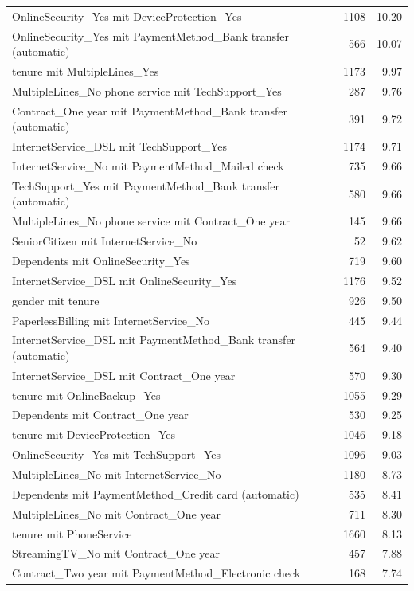 \documentclass[a4paper,11pt]{article}
\begin{document}
\begin{longtable}{p{9cm}rr}
OnlineSecurity\_Yes mit DeviceProtection\_Yes & 1108 & 10.20 \\
OnlineSecurity\_Yes mit PaymentMethod\_Bank transfer (automatic) & 566 & 10.07 \\
tenure mit MultipleLines\_Yes & 1173 & 9.97 \\
MultipleLines\_No phone service mit TechSupport\_Yes & 287 & 9.76 \\
Contract\_One year mit PaymentMethod\_Bank transfer (automatic) & 391 & 9.72 \\
InternetService\_DSL mit TechSupport\_Yes & 1174 & 9.71 \\
InternetService\_No mit PaymentMethod\_Mailed check & 735 & 9.66 \\
TechSupport\_Yes mit PaymentMethod\_Bank transfer (automatic) & 580 & 9.66 \\
MultipleLines\_No phone service mit Contract\_One year & 145 & 9.66 \\
SeniorCitizen mit InternetService\_No & 52 & 9.62 \\
Dependents mit OnlineSecurity\_Yes & 719 & 9.60 \\
InternetService\_DSL mit OnlineSecurity\_Yes & 1176 & 9.52 \\
gender mit tenure & 926 & 9.50 \\
PaperlessBilling mit InternetService\_No & 445 & 9.44 \\
InternetService\_DSL mit PaymentMethod\_Bank transfer (automatic) & 564 & 9.40 \\
InternetService\_DSL mit Contract\_One year & 570 & 9.30 \\
tenure mit OnlineBackup\_Yes & 1055 & 9.29 \\
Dependents mit Contract\_One year & 530 & 9.25 \\
tenure mit DeviceProtection\_Yes & 1046 & 9.18 \\
OnlineSecurity\_Yes mit TechSupport\_Yes & 1096 & 9.03 \\
MultipleLines\_No mit InternetService\_No & 1180 & 8.73 \\
Dependents mit PaymentMethod\_Credit card (automatic) & 535 & 8.41 \\
MultipleLines\_No mit Contract\_One year & 711 & 8.30 \\
tenure mit PhoneService & 1660 & 8.13 \\
StreamingTV\_No mit Contract\_One year & 457 & 7.88 \\
Contract\_Two year mit PaymentMethod\_Electronic check & 168 & 7.74 \\

\end{longtable}
\end{document}
